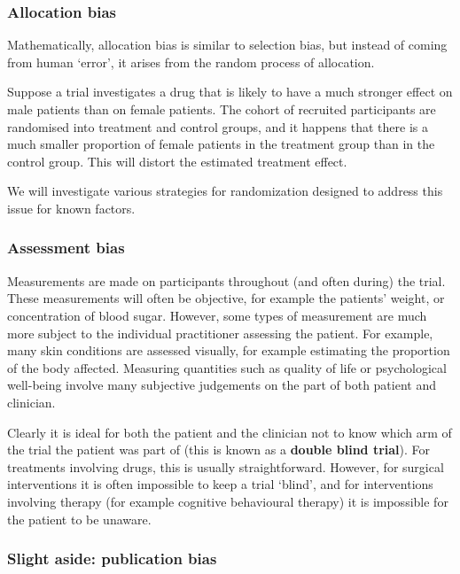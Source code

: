 \documentclass[
  openany]{book}
\theoremstyle{definition}
\theoremstyle{definition}
\theoremstyle{definition}
\theoremstyle{definition}
\theoremstyle{remark}
\begin{document}
\hypertarget{allocation-bias}{%
\subsubsection*{Allocation bias}\label{allocation-bias}}

Mathematically, allocation bias is similar to selection bias, but instead of coming from human `error', it arises from the random process of allocation.

Suppose a trial investigates a drug that is likely to have a much stronger effect on male patients than on female patients. The cohort of recruited participants are randomised into treatment and control groups, and it happens that there is a much smaller proportion of female patients in the treatment group than in the control group. This will distort the estimated treatment effect.

We will investigate various strategies for randomization designed to address this issue for known factors.

\hypertarget{assessment-bias}{%
\subsubsection*{Assessment bias}\label{assessment-bias}}

Measurements are made on participants throughout (and often during) the trial. These measurements will often be objective, for example the patients' weight, or concentration of blood sugar. However, some types of measurement are much more subject to the individual practitioner assessing the patient. For example, many skin conditions are assessed visually, for example estimating the proportion of the body affected. Measuring quantities such as quality of life or psychological well-being involve many subjective judgements on the part of both patient and clinician.

Clearly it is ideal for both the patient and the clinician not to know which arm of the trial the patient was part of (this is known as a \textbf{double blind trial}). For treatments involving drugs, this is usually straightforward. However, for surgical interventions it is often impossible to keep a trial `blind', and for interventions involving therapy (for example cognitive behavioural therapy) it is impossible for the patient to be unaware.

\hypertarget{slight-aside-publication-bias}{%
\subsubsection*{Slight aside: publication bias}\label{slight-aside-publication-bias}}
\end{document}
